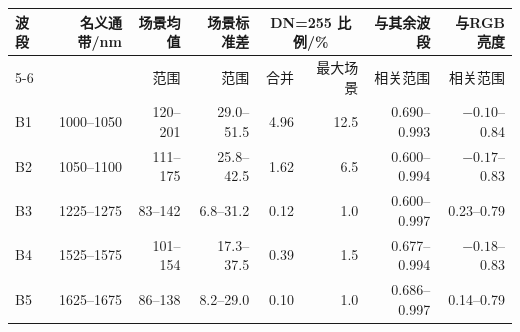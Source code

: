 \begin{tabular}{@{}lrrrrrrr@{}}
\toprule
波段 & 名义通带/nm & 场景均值 & 场景标准差 & \multicolumn{2}{c}{DN=255 比例/\%} & 与其余波段 & 与RGB亮度\\
\cmidrule(lr){5-6}
 & & 范围 & 范围 & 合并 & 最大场景 & 相关范围 & 相关范围\\
\midrule
B1 & 1000--1050 & 120--201 & 29.0--51.5 & 4.96 & 12.5 & 0.690--0.993 & $-0.10$--0.84 \\
B2 & 1050--1100 & 111--175 & 25.8--42.5 & 1.62 & 6.5 & 0.600--0.994 & $-0.17$--0.83 \\
B3 & 1225--1275 & 83--142 & 6.8--31.2 & 0.12 & 1.0 & 0.600--0.997 & 0.23--0.79 \\
B4 & 1525--1575 & 101--154 & 17.3--37.5 & 0.39 & 1.5 & 0.677--0.994 & $-0.18$--0.83 \\
B5 & 1625--1675 & 86--138 & 8.2--29.0 & 0.10 & 1.0 & 0.686--0.997 & 0.14--0.79 \\
\bottomrule
\end{tabular}
